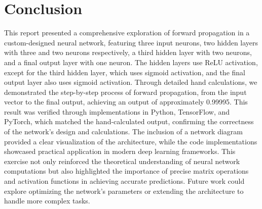 \documentclass[a4paper,12pt]{article}
\begin{document}
\section{Conclusion}
This report presented a comprehensive exploration of forward propagation in a custom-designed neural network, featuring three input neurons, two hidden layers with three and two neurons respectively, a third hidden layer with two neurons, and a final output layer with one neuron. The hidden layers use ReLU activation, except for the third hidden layer, which uses sigmoid activation, and the final output layer also uses sigmoid activation. Through detailed hand calculations, we demonstrated the step-by-step process of forward propagation, from the input vector to the final output, achieving an output of approximately 0.99995. This result was verified through implementations in Python, TensorFlow, and PyTorch, which matched the hand-calculated output, confirming the correctness of the network's design and calculations. The inclusion of a network diagram provided a clear visualization of the architecture, while the code implementations showcased practical application in modern deep learning frameworks. This exercise not only reinforced the theoretical understanding of neural network computations but also highlighted the importance of precise matrix operations and activation functions in achieving accurate predictions. Future work could explore optimizing the network's parameters or extending the architecture to handle more complex tasks.

\end{document}
